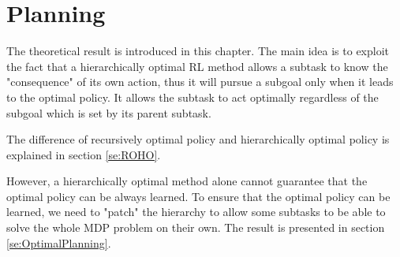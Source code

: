 



\chapter{Planning}

The theoretical result is introduced in this chapter. 
The main idea is to exploit the fact that a hierarchically optimal RL method allows 
a subtask to know the "consequence" of its own action, thus it will pursue a subgoal
only when it leads to the optimal policy. It allows the subtask to act optimally 
regardless of the subgoal which is set by its parent subtask.


The difference of recursively optimal policy and hierarchically optimal policy is explained
in section \ref{se:ROHO}. 

However, a hierarchically optimal method alone cannot guarantee that the optimal 
policy can be always learned. To ensure that the optimal policy can be learned, 
we need to "patch" the hierarchy to allow some subtasks to be able to solve
the whole MDP problem on their own. 
The result is presented in section \ref{se:OptimalPlanning}.


